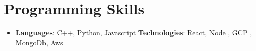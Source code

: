 \documentclass[letterpaper,11pt]{article}
\newcommand{\resumeSubHeadingListStart}{\begin{itemize}[leftmargin=*]}
\newcommand{\resumeSubHeadingListEnd}{\end{itemize}}
\begin{document}
\section{Programming Skills}
 \resumeSubHeadingListStart
   \item{
     \textbf{Languages}{: C++, Python, Javascript}
     \hfill
     \textbf{Technologies}{: React, Node , GCP , MongoDb, Aws}
   }
 \resumeSubHeadingListEnd


\end{document}
